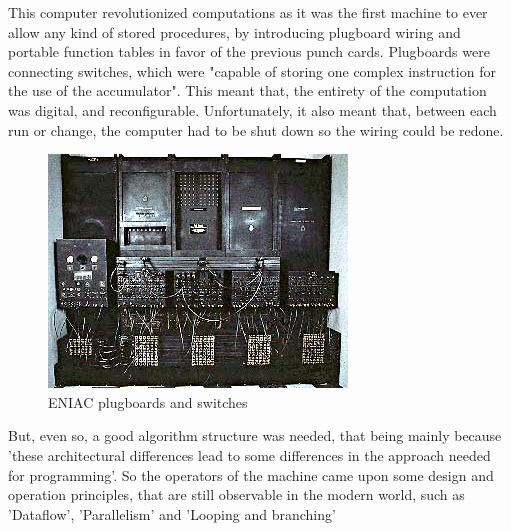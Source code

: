 \par
This computer revolutionized computations as it was the first machine to ever allow any kind of stored procedures, by introducing plugboard wiring and portable function tables in favor of the previous punch cards.
Plugboards were connecting switches, which were "capable of storing one complex instruction for the use of the accumulator".\cite{eniacSwitches}
This meant that, the entirety of the computation was digital, and reconfigurable.
Unfortunately, it also meant that, between each run or change, the computer had to be shut down so the wiring could be redone.
\begin{figure}[htbp]
    \centering
    \includegraphics[scale=0.5]{pictures/ENIAC_plugboard_switches.jpg}
    \caption{ENIAC plugboards and switches}
    \label{eniacPlugboardSwitches}
\end{figure}
\par
But, even so, a good algorithm structure was needed, that being mainly because 'these architectural differences lead to some differences in the approach needed for programming'\cite{eniacDesign}.
So the operators of the machine came upon some design and operation principles, that are still observable in the modern world, such as 'Dataflow', 'Parallelism' and 'Looping and branching' \cite{eniacDesign}


